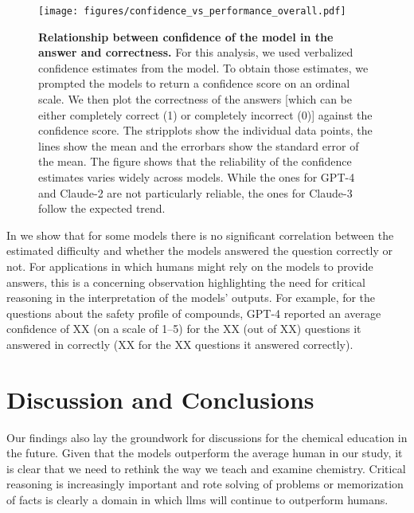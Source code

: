 \documentclass[11pt, oneside]{article}
\begin{document}
\begin{refsection}
\begin{figure}
    \centering
    \texttt{[image: figures/confidence\_vs\_performance\_overall.pdf]}
    \caption{\textbf{Relationship between confidence of the model in the answer and correctness.} For this analysis, we used verbalized confidence estimates from the model. To obtain those estimates, we prompted the models to return a confidence score on an ordinal scale. We then plot the correctness of the answers [which can be either completely correct (1) or completely incorrect (0)] against the confidence score.
        The stripplots show the individual data points, the lines show the mean and the errorbars show the standard error of the mean. The figure shows that the reliability of the confidence estimates varies widely across models. While the ones for GPT-4 and Claude-2 are not particularly reliable, the ones for Claude-3 follow the expected trend.}
    \label{fig:confidence_vs_performance}
\end{figure}

In  we show that for some models there is no significant correlation between the estimated difficulty and whether the models answered the question correctly or not.
For applications in which humans might rely on the models to provide answers, this is a concerning observation highlighting the need for critical reasoning in the interpretation of the models' outputs.\autocite{Li_2023}
For example, for the questions about the safety profile of compounds, GPT-4 reported an average confidence of XX (on a scale of 1--5) for the XX (out of XX) questions it answered in correctly (XX for the XX questions it answered correctly).

\section{Discussion and Conclusions}
Our findings also lay the groundwork for discussions for the chemical education in the future. 
Given that the models outperform the average human in our study, it is clear that we need to rethink the way we teach and examine chemistry.
Critical reasoning is increasingly important and rote solving of problems or memorization of facts is clearly a domain in which \glspl{llm} will continue to outperform humans.




\end{refsection}
\end{document}
